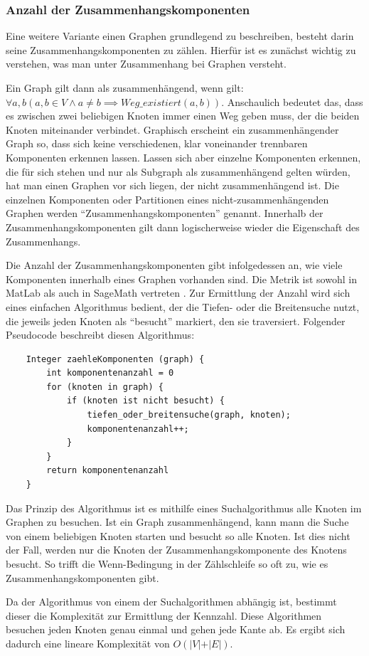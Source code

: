 \documentclass[a4paper,12pt,ngerman,chapterprefix=false,listof=totoc,bibliography=totoc]{scrreprt}
\begin{document}
\subsubsection*{Anzahl der Zusammenhangskomponenten}
{
Eine weitere Variante einen Graphen grundlegend zu beschreiben, besteht darin seine Zusammenhangskomponenten zu zählen. Hierfür ist es zunächst wichtig zu verstehen, was man unter Zusammenhang bei Graphen versteht.

Ein Graph gilt dann als zusammenhängend, wenn gilt: \(\forall a, b(a,b\in V \land a\neq b \implies Weg\_existiert(a, b))\). Anschaulich bedeutet das, dass es zwischen zwei beliebigen Knoten immer einen Weg geben muss, der die beiden Knoten miteinander verbindet. Graphisch erscheint ein zusammenhängender Graph so, dass sich keine verschiedenen, klar voneinander trennbaren Komponenten erkennen lassen. Lassen sich aber einzelne Komponenten erkennen, die für sich stehen und nur als Subgraph als zusammenhängend gelten würden, hat man einen Graphen vor sich liegen, der nicht zusammenhängend ist. Die einzelnen Komponenten oder Partitionen eines nicht-zusammenhängenden Graphen werden "`Zusammenhangskomponenten"' genannt. Innerhalb der Zusammenhangskomponenten gilt dann logischerweise wieder die Eigenschaft des Zusammenhangs. \cite{diestel_graphentheorie_2000}

Die Anzahl der Zusammenhangskomponenten gibt infolgedessen an, wie viele Komponenten innerhalb eines Graphen vorhanden sind. Die Metrik ist sowohl in MatLab als auch in SageMath vertreten \cite{sagemath_graph_2020,matlab_graph_2020}. Zur Ermittlung der Anzahl wird sich eines einfachen Algorithmus bedient, der die Tiefen- oder die Breitensuche nutzt, die jeweils jeden Knoten als "`besucht"' markiert, den sie traversiert. Folgender Pseudocode beschreibt diesen Algorithmus:
\begin{lstlisting}
	Integer zaehleKomponenten (graph) {
		int komponentenanzahl = 0
		for (knoten in graph) {
			if (knoten ist nicht besucht) {
				tiefen_oder_breitensuche(graph, knoten);
				komponentenanzahl++;
			}
		}
		return komponentenanzahl
	}
\end{lstlisting}
Das Prinzip des Algorithmus ist es mithilfe eines Suchalgorithmus alle Knoten im Graphen zu besuchen. Ist ein Graph zusammenhängend, kann mann die Suche von einem beliebigen Knoten starten und besucht so alle Knoten. Ist dies nicht der Fall, werden nur die Knoten der Zusammenhangskomponente des Knotens besucht. So trifft die Wenn-Bedingung in der Zählschleife so oft zu, wie es Zusammenhangskomponenten gibt.

Da der Algorithmus von einem der Suchalgorithmen abhängig ist, bestimmt dieser die Komplexität zur Ermittlung der Kennzahl. Diese Algorithmen besuchen jeden Knoten genau einmal und gehen jede Kante ab. Es ergibt sich dadurch eine lineare Komplexität von \(O(\vert V\vert +\vert E\vert)\).
}
\end{document}
